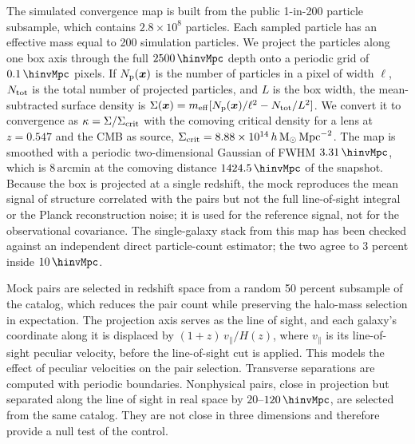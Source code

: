The simulated convergence map is built from the public 1-in-200 particle
subsample, which contains $2.8\times10^{8}$ particles. Each sampled particle
has an effective mass equal to 200 simulation particles. We project the
particles along one box axis through
the full $2500\,\hinvMpc$ depth onto a periodic grid of $0.1\,\hinvMpc$
pixels. If $N_{\rm p}(\boldsymbol{x})$ is the number of particles in a pixel
of width $\ell$, $N_{\rm tot}$ is the total number of projected particles,
and $L$ is the box width, the mean-subtracted surface density is
$\Sigma(\boldsymbol{x})=m_{\rm eff}[N_{\rm p}(\boldsymbol{x})/\ell^{2}
-N_{\rm tot}/L^{2}]$. We convert it to convergence as
$\kappa=\Sigma/\Sigma_{\rm crit}$ with the comoving critical density for a
lens at $z=0.547$ and the CMB as source,
$\Sigma_{\rm crit}=8.88\times10^{14}\,h\,\mathrm{M}_{\odot}\,\mathrm{Mpc}^{-2}$.
The map is smoothed with a periodic two-dimensional Gaussian of FWHM
$3.31\,\hinvMpc$, which is $8\,\mathrm{arcmin}$ at the comoving distance
$1424.5\,\hinvMpc$ of the snapshot. Because the box is projected at a single
redshift, the mock reproduces the mean signal of structure correlated with
the pairs but not the full line-of-sight integral or the Planck
reconstruction noise; it is used for the reference signal, not for the
observational covariance. The single-galaxy stack from this map has been
checked against an independent direct particle-count estimator; the two
agree to 3 percent inside $10\,\hinvMpc$.

Mock pairs are selected in redshift space from a random 50 percent subsample
of the catalog, which reduces the pair count while preserving the halo-mass
selection in expectation. The projection axis serves as the line of sight,
and each galaxy's coordinate along it is displaced by
$(1+z)\,v_{\parallel}/H(z)$, where $v_{\parallel}$ is its line-of-sight
peculiar velocity, before the line-of-sight cut is applied. This models the
effect of peculiar velocities on the pair selection. Transverse
separations are computed with periodic boundaries.
Nonphysical pairs, close in projection but separated along the line of
sight in real space by $20$--$120\,\hinvMpc$, are selected from the same
catalog. They are not close in three dimensions and therefore provide a null
test of the control.
